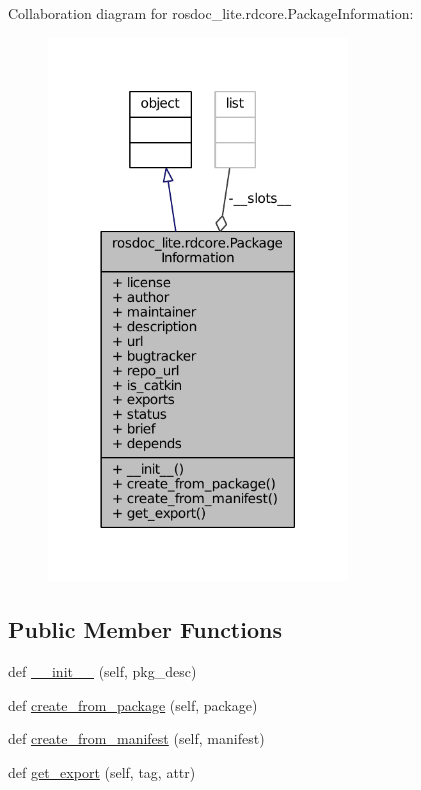 Collaboration diagram for rosdoc\+\_\+lite.\+rdcore.\+Package\+Information\+:
\nopagebreak
\begin{figure}[H]
\begin{center}
\leavevmode
\includegraphics[width=225pt]{classrosdoc__lite_1_1rdcore_1_1PackageInformation__coll__graph}
\end{center}
\end{figure}
\subsection*{Public Member Functions}
\begin{DoxyCompactItemize}
\item 
def \hyperlink{classrosdoc__lite_1_1rdcore_1_1PackageInformation_abf132ea8f828e7acb8a5737144871ba1}{\+\_\+\+\_\+init\+\_\+\+\_\+} (self, pkg\+\_\+desc)
\item 
def \hyperlink{classrosdoc__lite_1_1rdcore_1_1PackageInformation_a2349efef3941fbc9e024588a769ba5a1}{create\+\_\+from\+\_\+package} (self, package)
\item 
def \hyperlink{classrosdoc__lite_1_1rdcore_1_1PackageInformation_a70b6ecda19942af2a315e5601a90a562}{create\+\_\+from\+\_\+manifest} (self, manifest)
\item 
def \hyperlink{classrosdoc__lite_1_1rdcore_1_1PackageInformation_a3f0b27b56c8348f04dc646f38117ab80}{get\+\_\+export} (self, tag, attr)
\end{DoxyCompactItemize}
